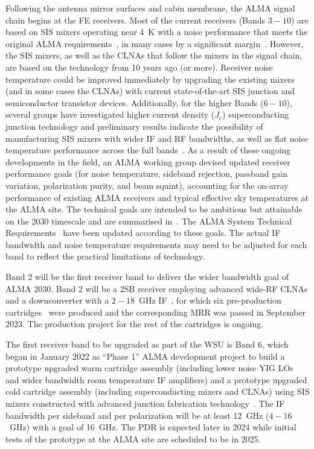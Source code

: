 Following the antenna mirror surfaces and cabin membrane, the ALMA signal chain begins at the FE receivers. Most of the current receivers (Bands $3-10$) are based on SIS mixers operating near 4~K with a noise performance that meets the original ALMA requirements~\cite{sys_reqs}, in many cases by a significant margin~\cite{fed}.   However, the SIS mixers, as well as the CLNAs that follow the mixers in the signal chain, are based on the technology from 10 years ago (or more). Receiver noise temperature could be improved immediately by upgrading the existing mixers (and in some cases the CLNAs) with current state-of-the-art SIS junction and semiconductor transistor devices. Additionally, for the higher Bands ($6-10$), several groups have investigated higher current density ($J_c$) superconducting junction technology and preliminary results indicate the possibility of manufacturing SIS mixers with wider IF and RF bandwidths, as well as flat noise temperature performance across the full bands~\cite{ESOfeconf}.  As a result of these ongoing developments in the field, an ALMA working group devised updated receiver performance goals (for noise temperature, sideband rejection, passband gain variation, polarization purity, and beam squint), accounting for the on-array performance of existing ALMA receivers and typical effective sky temperatures at the ALMA site. The technical goals are intended to be ambitious but attainable on the 2030 timescale and are summarised in~\cite{fed}.  The ALMA System Technical Requirements~\cite{sys_reqs} have been updated according to these goals.  The actual IF bandwidth and noise temperature requirements may need to be adjusted for each band to reflect the practical limitations of technology.

Band 2 will be the first receiver band to deliver the wider bandwidth goal of ALMA 2030.  Band 2 will be a 2SB receiver employing advanced wide-RF CLNAs and a downconverter with a $2-18$~GHz IF~\cite{b2cre}, for which six pre-production cartridges~\cite{b2} were produced and the corresponding MRR was passed in September 2023. The production project for the rest of the cartridges is ongoing.

The first receiver band to be upgraded as part of the WSU is Band 6, which began in January 2022 as ``Phase 1'' ALMA development project to build a prototype upgraded warm cartridge assembly (including lower noise YIG LOs and wider bandwidth room temperature IF amplifiers) and a prototype upgraded cold cartridge assembly (including superconducting mixers and CLNAs) using SIS mixers constructed with advanced junction fabrication technology~\cite{b6up}. The IF bandwidth per sideband and per polarization will be at least 12~GHz ($4-16$~GHz) with a goal of 16~GHz.  The PDR is expected later in 2024 while initial tests of the prototype at the ALMA site are scheduled to be in 2025.

